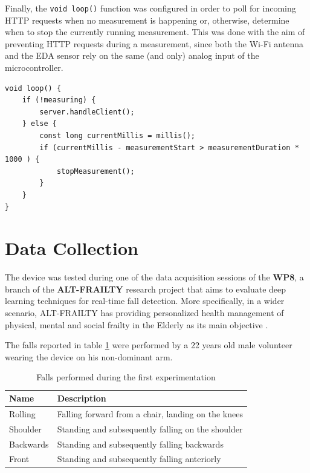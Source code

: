 Finally, the \texttt{void loop()} function was configured in order to poll for incoming HTTP requests when no measurement is happening or, otherwise, determine when to stop the currently running measurement. This was done with the aim of preventing HTTP requests during a measurement, since both the Wi-Fi antenna and the EDA sensor rely on the same (and only) analog input of the microcontroller.

\begin{verbatim}
void loop() {
    if (!measuring) {
        server.handleClient();
    } else {
        const long currentMillis = millis();
        if (currentMillis - measurementStart > measurementDuration * 1000 ) {
            stopMeasurement();
        }
    }
}
\end{verbatim}

\pagebreak

\section{Data Collection}\label{sec:data-collection}


The device was tested during one of the data acquisition sessions of the \textbf{WP8}, a branch of the \textbf{ALT-FRAILTY} research project that aims to evaluate deep learning techniques for real-time fall detection. More specifically, in a wider scenario, ALT-FRAILTY has providing personalized health management of physical, mental and social frailty in the Elderly as its main objective \cite{altfrailty}.

The falls reported in table \ref{toc:bitalino-falls} were performed by a 22 years old male volunteer wearing the device on his non-dominant arm.

\vspace{7mm}

\begin{table}[H]
\centering
\begin{tabular}{ll}
    \hline
    Name            &  Description           \\
    \hline
    Rolling         & Falling forward from a chair, landing on the knees \\
    Shoulder        & Standing and subsequently falling on the shoulder \\
    Backwards       & Standing and subsequently falling backwards \\
    Front           & Standing and subsequently falling anteriorly \\
    \hline
\end{tabular}
\caption{Falls performed during the first experimentation}
\label{toc:bitalino-falls}
\end{table}

